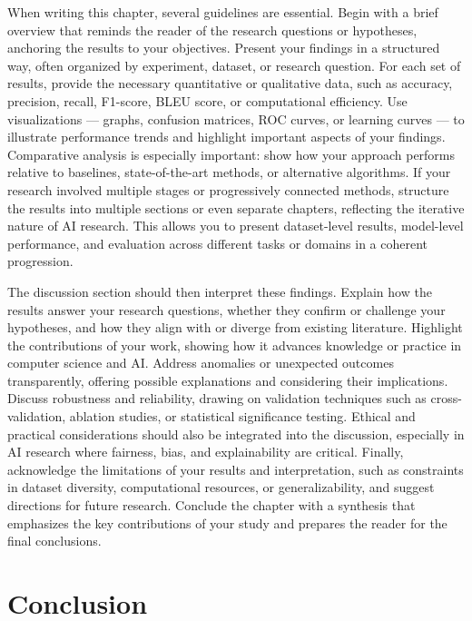 \documentclass[PCOM,Thesis,Review]{mpThesis}
\begin{document}
\begin{MainMatter}
\begin{Remark}
When writing this chapter, several guidelines are essential.
Begin with a brief overview that reminds the reader of the research questions or hypotheses, anchoring the results to your objectives.
Present your findings in a structured way, often organized by experiment, dataset, or research question.
For each set of results, provide the necessary quantitative or qualitative data, such as accuracy, precision, recall, F1-score, BLEU score, or computational efficiency.
Use visualizations --- graphs, confusion matrices, ROC curves, or learning curves ---
to illustrate performance trends and highlight important aspects of your findings.
Comparative analysis is especially important: show how your approach performs relative to baselines, state-of-the-art methods, or alternative algorithms.
If your research involved multiple stages or progressively connected methods, structure the results into multiple sections or even separate chapters, reflecting the iterative nature of AI research.
This allows you to present dataset-level results, model-level performance, and evaluation across different tasks or domains in a coherent progression.

The discussion section should then interpret these findings.
Explain how the results answer your research questions, whether they confirm or challenge your hypotheses, and how they align with or diverge from existing literature.
Highlight the contributions of your work, showing how it advances knowledge or practice in computer science and AI.
Address anomalies or unexpected outcomes transparently, offering possible explanations and considering their implications.
Discuss robustness and reliability, drawing on validation techniques such as cross-validation, ablation studies, or statistical significance testing.
Ethical and practical considerations should also be integrated into the discussion, especially in AI research where fairness, bias, and explainability are critical.
Finally, acknowledge the limitations of your results and interpretation, such as constraints in dataset diversity, computational resources, or generalizability,
and suggest directions for future research.
Conclude the chapter with a synthesis that emphasizes the key contributions of your study and prepares the reader for the final conclusions.
\end{Remark}

\chapter{Conclusion}
\label{ch:conclusion}
\minitoc


\end{MainMatter}
\end{document}
